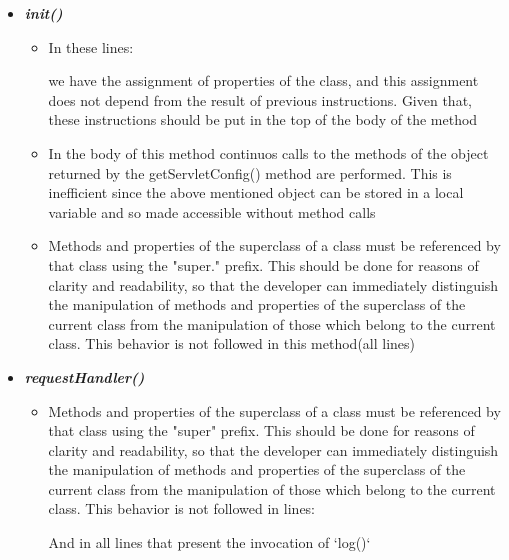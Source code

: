 \documentclass[11pt,titlepage]{article} %
\begin{document}
    \begin{itemize}
      \item \textbf{\textit{init()}}
	\begin{itemize}
	 \item In these lines:
	    
	    
	    
	    we have the assignment of properties of the class, and this assignment does not
	    depend from the result of previous instructions. Given that, these instructions should be
	    put in the top of the body of the method
	 \item In the body of this method continuos calls to the methods of the object returned by the
	    getServletConfig() method are performed.
	    This is inefficient since the above mentioned object can be stored in a local variable
	    and so made accessible without method calls
	 \item Methods and properties of the superclass of a class must be referenced by that class using
	    the "super." prefix. This should be done for reasons of clarity and readability, so that
	    the developer can immediately distinguish the manipulation of methods and properties of the superclass of the current class
	    from the manipulation of those which belong to the current class.\newline
	    This behavior is not followed in this method(all lines)

	\end{itemize}

      \item \textbf{\textit{requestHandler()}}
	  \begin{itemize}
	      \item Methods and properties of the superclass of a class must be referenced by that class using
		the "super" prefix. This should be done for reasons of clarity and readability, so that
		the developer can immediately distinguish the manipulation of methods and properties of the superclass of the current class
		from the manipulation of those which belong to the current class.\newline
		This behavior is not followed in lines:
		
		And in all lines that present the invocation of `log()`


\end{itemize}
\end{itemize}
\end{document}
